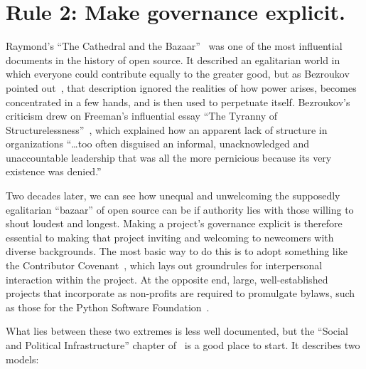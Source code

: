 \documentclass[10pt,letterpaper]{article}
\newcommand{\rulemajor}[1]{\section{#1}}
\begin{document}
\rulemajor{Rule 2: Make governance explicit.}

Raymond's ``The Cathedral and the Bazaar''~\cite{raymond2001}
was one of the most influential documents in the history of open source.
It described an egalitarian world in which everyone could contribute equally to the greater good,
but as Bezroukov pointed out~\cite{bezroukov1999},
that description ignored the realities of how power arises,
becomes concentrated in a few hands,
and is then used to perpetuate itself.
Bezroukov's criticism drew on Freeman's influential essay ``The Tyranny of Structurelessness''~\cite{freeman1972},
which explained how an apparent lack of structure in organizations ``{\ldots}too often disguised an informal,
unacknowledged and unaccountable leadership that was all the more pernicious because its very existence was denied.''

Two decades later,
we can see how unequal and unwelcoming the supposedly egalitarian ``bazaar'' of open source can be
if authority lies with those willing to shout loudest and longest.
Making a project's governance explicit is therefore essential to making that project inviting and welcoming to newcomers with diverse backgrounds.
The most basic way to do this is to adopt something like the Contributor Covenant~\cite{covenant},
which lays out groundrules for interpersonal interaction within the project.
At the opposite end,
large, well-established projects that incorporate as non-profits are required to promulgate bylaws,
such as those for the Python Software Foundation~\cite{psf-bylaws}.

What lies between these two extremes is less well documented,
but the ``Social and Political Infrastructure'' chapter of~\cite{fogel2005} is a good place to start.
It describes two models:
\end{document}
